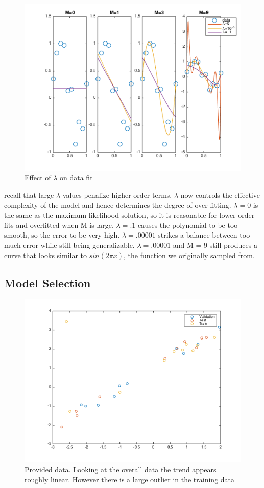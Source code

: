 \documentclass[10pt,twocolumn]{article}
\begin{document}
\begin{figure}[H]
\center
\includegraphics[scale =.5]{rr_lambdas.png}
\caption{Effect of $\lambda$ on data fit}
\end{figure}

recall that large $\lambda$ values penalize higher order terms. $\lambda$ now controls the effective complexity
of the model and hence determines the degree of over-fitting.  $\lambda = 0$ is the same as the maximum likelihood solution, so it is reasonable for lower order fits and overfitted when M is large. $\lambda = .1$ causes the polynomial to be too smooth, so the error to be very high. $\lambda = .00001$ strikes a balance between too much error while still being generalizable. $\lambda = .00001$ and M = 9 still produces a curve that looks similar to $sin(2\pi x)$, the function we originally sampled from.

\subsection*{ Model Selection}

\begin{figure}[H]
\center
\includegraphics[scale =.4]{test_train_validate.png}
\caption{Provided data. Looking at the overall data the trend appears roughly linear. However there is a large outlier in the training data}
\end{figure}
\end{document}
